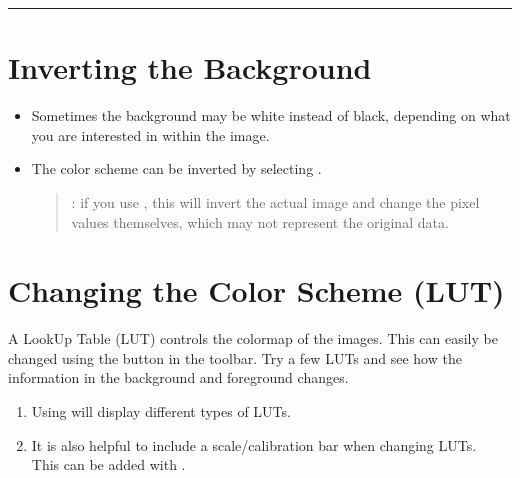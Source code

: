 \documentclass[letterpaper,10pt,english]{jupyterBook}
\begin{document}
\sphinxAtStartPar
{}


\bigskip\hrule\bigskip



\section{Inverting the Background}
\label{\detokenize{basics:inverting-the-background}}\begin{itemize}
\item {} 
\sphinxAtStartPar
Sometimes the background may be white instead of black, depending on what you are
interested in within the image.

\item {} 
\sphinxAtStartPar
The color scheme can be inverted by selecting .
\begin{quote}

\sphinxAtStartPar
{}: if you use , this will invert the actual image and change
the pixel values themselves, which may not represent the original data.
\end{quote}

\end{itemize}


\section{Changing the Color Scheme (LUT)}
\label{\detokenize{basics:changing-the-color-scheme-lut}}
\sphinxAtStartPar
A LookUp Table (LUT) controls the colormap of the images.
This can easily be changed using the  button in the toolbar.
Try a few LUTs and see how the information in the background and foreground changes.
\begin{enumerate}
%
\item {} 
\sphinxAtStartPar
Using  will display different types of LUTs.

\item {} 
\sphinxAtStartPar
It is also helpful to include a scale/calibration bar when changing LUTs.\\
This can be added with .

\end{enumerate}

\sphinxAtStartPar
{}
\end{document}
